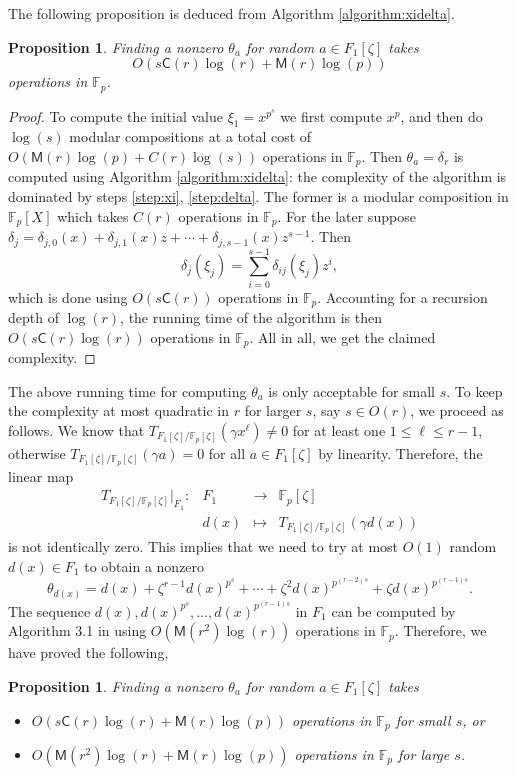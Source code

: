 \documentclass[12pt]{article}
\theoremstyle{plain}
\newtheorem{proposition}[theorem]{Proposition}
\theoremstyle{definition}
\def\F{\mathbb{F}}
\def\M{\mathsf{M}}
\def\CC{\mathsf{C}}
\newcounter{algorithm}
\begin{document}
The following proposition is deduced from Algorithm \ref{algorithm:xidelta}.
\begin{proposition}
\label{proposition:XiDelta}
	Finding a nonzero $\theta_a$ for random $a \in F_1[\zeta]$ takes \[O(s\CC(r)\log(r) + \M(r)\log(p))\] operations in $\F_p$.
\end{proposition}
\begin{proof}
	To compute the initial value $\xi_1 = x^{p^s}$ we first compute $x^p$, and then do $\log(s)$ modular compositions at a total cost
of $O(\M(r)\log(p) + C(r)\log(s))$ operations in $\F_p$. Then $\theta_a = \delta_r$ is computed using Algorithm
\ref{algorithm:xidelta}: the complexity of the algorithm is dominated by steps \ref{step:xi}, \ref{step:delta}. The former is a
modular composition in $\F_p[X]$ which takes $C(r)$ operations in $\F_p$. For the later suppose $\delta_j = \delta_{j,0}(x) +
\delta_{j,1}(x)z + \cdots + \delta_{j,s - 1}(x)z^{s - 1}$. Then   
	\[ \delta_j(\xi_j) = \sum_{i = 0}^{s - 1}\delta_{ij}(\xi_j)z^i, \]
	which is done using $O(s\CC(r))$ operations in $\F_p$. Accounting for a recursion depth of $\log(r)$, the running time of the
algorithm is then $O(s\CC(r)\log(r))$ operations in $\F_p$. All in all, we get the claimed complexity.
\end{proof}
The above running time for computing $\theta_a$ is only acceptable for small $s$. To keep the complexity at most quadratic in $r$
for larger $s$, say $s \in O(r)$, we proceed as follows. We know that $T_{F_1[\zeta] / \F_p[\zeta]}(\gamma x^\ell) \ne 0$ for at
least one $1 \le \ell \le r - 1$, otherwise $T_{F_1[\zeta] / \F_p[\zeta]}(\gamma a) = 0$ for all $a \in F_1[\zeta]$ by linearity.
Therefore, the linear map 
\[
\begin{array}{rrll}
	T_{F_1[\zeta] / \F_p[\zeta]}\vert_{F_1}: & F_1 & \longrightarrow & \F_p[\zeta] \\
	& d(x) & \longmapsto & T_{F_1[\zeta] / \F_p[\zeta]}(\gamma d(x))
\end{array}
\]
is not identically zero. This implies that we need to try at most $O(1)$ random $d(x) \in F_1$ to obtain a nonzero
\[ \theta_{d(x)} = d(x) + \zeta^{r - 1}d(x)^{p^s} + \cdots + \zeta^2d(x)^{p^{(r - 2)s}} + \zeta d(x)^{p^{(r - 1)s}}. \]
The sequence $d(x), d(x)^{p^s}, \dots, d(x)^{p^{(r - 1)s}}$ in $F_1$ can be computed by Algorithm 3.1 in \cite{von1992computing}
using $O(\M(r^2)\log(r))$ operations in $\F_p$. Therefore, we have proved the following,
\begin{proposition}
\label{proposition:XiDelta-updated}
	Finding a nonzero $\theta_a$ for random $a \in F_1[\zeta]$ takes
	\begin{itemize}
		\item $O(s\CC(r)\log(r) + \M(r)\log(p))$ operations in $\F_p$ for small $s$, or
		\item $O(\M(r^2)\log(r) + \M(r)\log(p))$ operations in $\F_p$ for large $s$.
	\end{itemize}
\end{proposition}
\end{document}
